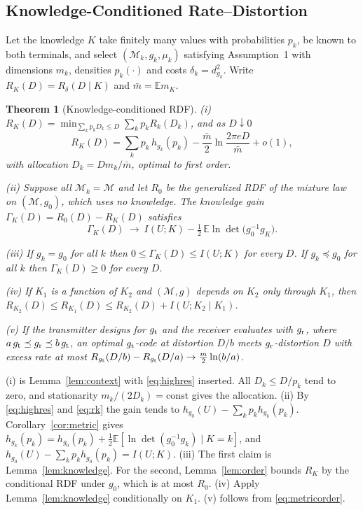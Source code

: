 \documentclass[10pt,journal]{IEEEtran}
\newtheorem{theorem}{Theorem}
\newcommand{\E}{\mathbb E}
\newcommand{\M}{\mathcal M}
\begin{document}
\subsection{Knowledge-Conditioned Rate--Distortion}
Let the knowledge $K$ take finitely many values with probabilities $p_k$, be known to both terminals, and select $(\M_k,g_k,\mu_k)$ satisfying Assumption~1 with dimensions $m_k$, densities $p_k(\cdot)$ and costs $\delta_k=d_{g_k}^2$. Write $R_K(D)=R_\delta(D\mid K)$ and $\bar m=\E m_K$.
\begin{theorem}[Knowledge-conditioned RDF]\label{thm:knowledge}
(i) $R_K(D)=\min_{\sum_kp_kD_k\le D}\sum_kp_kR_k(D_k)$, and as $D\downarrow0$
\begin{equation}
 R_K(D)=\sum_kp_k\,h_{g_k}(p_k)-\frac{\bar m}2\ln\frac{2\pi eD}{\bar m}+o(1), \label{eq:rk}
\end{equation}
with allocation $D_k=Dm_k/\bar m$, optimal to first order.

(ii) Suppose all $\M_k=\M$ and let $R_0$ be the generalized RDF of the mixture law on $(\M,g_0)$, which uses no knowledge. The knowledge gain $\Gamma_K(D)=R_0(D)-R_K(D)$ satisfies
\begin{equation}
 \Gamma_K(D)\ \to\ I(U;K)-\tfrac12\,\E\ln\det\big(g_0^{-1}g_K\big). \label{eq:gain}
\end{equation}

(iii) If $g_k=g_0$ for all $k$ then $0\le\Gamma_K(D)\le I(U;K)$ for every $D$. If $g_k\preceq g_0$ for all $k$ then $\Gamma_K(D)\ge0$ for every $D$.

(iv) If $K_1$ is a function of $K_2$ and $(\M,g)$ depends on $K_2$ only through $K_1$, then $R_{K_2}(D)\le R_{K_1}(D)\le R_{K_2}(D)+I(U;K_2\mid K_1)$.

(v) If the transmitter designs for $g_{\rm t}$ and the receiver evaluates with $g_{\rm r}$, where $a\,g_{\rm t}\preceq g_{\rm r}\preceq b\,g_{\rm t}$, an optimal $g_{\rm t}$-code at distortion $D/b$ meets $g_{\rm r}$-distortion $D$ with excess rate at most $R_{g_{\rm t}}(D/b)-R_{g_{\rm t}}(D/a)\to\frac m2\ln(b/a)$.
\end{theorem}
\begin{IEEEproof}
(i) is Lemma~\ref{lem:context} with \eqref{eq:highres} inserted. All $D_k\le D/p_k$ tend to zero, and stationarity $m_k/(2D_k)=\mathrm{const}$ gives the allocation. (ii) By \eqref{eq:highres} and \eqref{eq:rk} the gain tends to $h_{g_0}(U)-\sum_kp_kh_{g_k}(p_k)$. Corollary~\ref{cor:metric} gives $h_{g_k}(p_k)=h_{g_0}(p_k)+\frac12\E[\ln\det(g_0^{-1}g_k)\mid K=k]$, and $h_{g_0}(U)-\sum_kp_kh_{g_0}(p_k)=I(U;K)$. (iii) The first claim is Lemma~\ref{lem:knowledge}. For the second, Lemma~\ref{lem:order} bounds $R_K$ by the conditional RDF under $g_0$, which is at most $R_0$. (iv) Apply Lemma~\ref{lem:knowledge} conditionally on $K_1$. (v) follows from \eqref{eq:metricorder}.
\end{IEEEproof}
\end{document}
